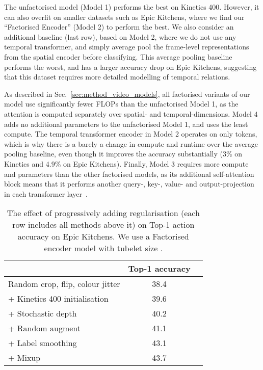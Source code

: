 \documentclass[10pt,twocolumn,letterpaper]{article}
\begin{document}
The unfactorised model (Model 1) performs the best on Kinetics 400.
However, it can also overfit on smaller datasets such as Epic Kitchens, where we find our ``Factorised Encoder'' (Model 2) to perform the best.
We also consider an additional baseline (last row), based on Model 2, where we do not use any temporal transformer, and simply average pool the frame-level representations from the spatial encoder before classifying.
This average pooling baseline performs the worst, and has a larger accuracy drop on Epic Kitchens, suggesting that this dataset requires more detailed modelling of temporal relations.

As described in Sec.~\ref{sec:method_video_models}, all factorised variants of our model use significantly fewer FLOPs than the unfactorised Model 1, as the attention is computed separately over spatial- and temporal-dimensions.
Model 4 adds no additional parameters to the unfactorised Model 1, and uses the least compute.
The temporal transformer encoder in Model 2 operates on only  tokens, which is why there is a barely a change in compute and runtime over the average pooling baseline, even though it improves the accuracy substantially (3\% on Kinetics and 4.9\% on Epic Kitchens).
Finally, Model 3 requires more compute and parameters than the other factorised models, as its additional self-attention block means that it performs another query-, key-, value- and output-projection in each transformer layer~\cite{vaswani_neurips_2017}.


\begin{table}[t]
	\centering
	\caption{
		The effect of progressively adding regularisation (each row includes all methods above it) on Top-1 action accuracy on Epic Kitchens.
		We use a Factorised encoder model with tubelet size .
	}
	\small{  \begin{tabular}{lcc}
			\toprule 
			& Top-1 accuracy  \\ 
			\midrule
			Random crop, flip, colour jitter           &      38.4   		\\   + Kinetics 400 initialisation 				 &      39.6  		\\  + Stochastic depth~\cite{huang_stochasticdepth_eccv_2016}       				 &      40.2 			\\  + Random augment~\cite{cubuk_arxiv_2019}             				&      41.1 	 \\   + Label smoothing~\cite{szegedy_cvpr_2016}             				  &      43.1      \\   + Mixup~\cite{zhang_mixup_iclr_2018}                       	 	  				&      43.7 	   \\   \bottomrule
		\end{tabular}
	}
	\label{tab:regularisation_epic_kitchens}
	\vspace{-\baselineskip}
\end{table}
\end{document}
